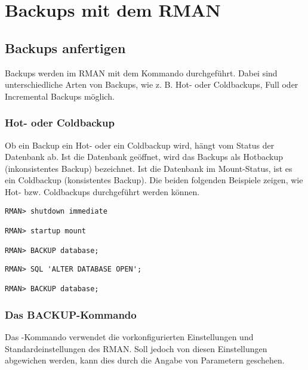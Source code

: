   \chapter{Backups mit dem RMAN}
    \setcounter{page}{1}
    \minitoc
\newpage
    \section{Backups anfertigen}
      Backups werden im RMAN mit dem Kommando 
      durchgef\"uhrt. Dabei sind  unterschiedliche Arten von Backups, wie z. B.
      Hot- oder Coldbackups, Full oder Incremental Backups m\"oglich.
      \subsection{Hot- oder Coldbackup}
        Ob ein Backup ein Hot- oder ein Coldbackup wird, h\"angt vom Status der Datenbank ab. Ist die Datenbank ge\"offnet, wird das Backups als Hotbackup (inkonsistentes Backup) bezeichnet. Ist die Datenbank im Mount-Status, ist es ein Coldbackup (konsistentes Backup). Die beiden folgenden Beispiele zeigen, wie Hot- bzw. Coldbackups durchgef\"uhrt werden k\"onnen.
        \begin{lstlisting}[caption={Ein Coldbackup durchf\"uhren},label=admin1300,language=rman,alsolanguage=sqlplus]
RMAN> shutdown immediate

RMAN> startup mount

RMAN> BACKUP database;
        \end{lstlisting}
        \begin{lstlisting}[caption={Ein Hotbackup durchf\"uhren},label=admin1301,language=rman,emph={[9]ALTER,OPEN,DATABASE},emphstyle={[9]\color{magenta}\bfseries}]
RMAN> SQL 'ALTER DATABASE OPEN';

RMAN> BACKUP database;
          \end{lstlisting}
      \subsection{Das BACKUP-Kommando}
        Das -Kommando verwendet die vorkonfigurierten Einstellungen und Standardeinstellungen des RMAN. Soll jedoch von diesen Einstellungen abgewichen werden, kann dies durch die Angabe von Parametern geschehen.
